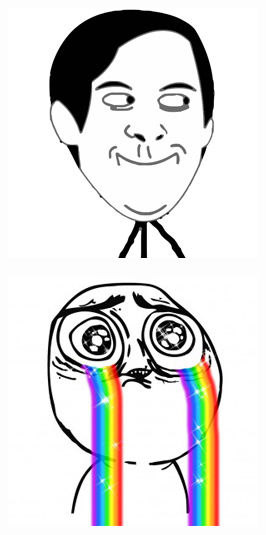 \begin{multicols}{8}
\begin{center}
\includegraphics[width=\linewidth]{./IMG-GIT/MEMES/Meme-Faces-19.jpg}  
\end{center}

\begin{center}
\includegraphics[width=\linewidth]{./IMG-GIT/MEMES/Meme-Faces-29.jpg}  
\end{center}


\end{multicols}
